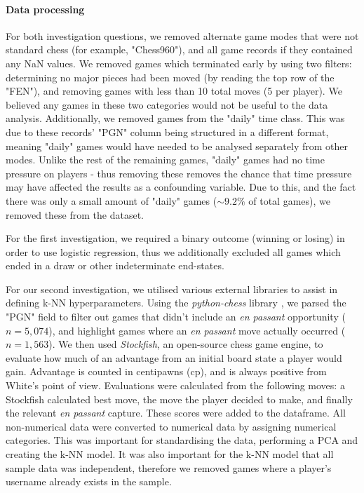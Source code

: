 \documentclass[10pt,a4paper]{article}
\begin{document}
\begin{multicols}{2}
\paragraph{Data processing}
For both investigation questions, we removed alternate game modes that were not standard chess (for example, "Chess960"), and all game records if they contained any NaN values. We removed games which terminated early by using two filters: determining no major pieces had been moved (by reading the top row of the "FEN"), and removing games with less than 10 total moves (5 per player). We believed any games in these two categories would not be useful to the data analysis. Additionally, we removed games from the "daily" time class. This was due to these records' "PGN" column being structured in a different format, meaning "daily" games would have needed to be analysed separately from other modes. Unlike the rest of the remaining games, "daily" games had no time pressure on players - thus removing these removes the chance that time pressure may have affected the results as a confounding variable. Due to this, and the fact there was only a small amount of "daily" games ($\sim9.2\%$ of total games), we removed these from the dataset.\newline

For the first investigation, we required a binary outcome (winning or losing) in order to use logistic regression, thus we additionally excluded all games which ended in a draw or other indeterminate end-states. \newline

For our second investigation, we utilised various external libraries to assist in defining k-NN hyperparameters. Using the \textit{python-chess} library \cite{python-chess}, we parsed the "PGN" field to filter out games that didn't include an \textit{en passant} opportunity ($n=5,074$), and highlight games where an \textit{en passant} move actually occurred ($n=1,563$). We then used \textit{Stockfish}\cite{StockFish}, an open-source chess game engine, to evaluate how much of an advantage from an initial board state a player would gain. Advantage is counted in centipawns (cp), and is always positive from White's point of view. Evaluations were calculated from the following moves: a Stockfish calculated best move, the move the player decided to make, and finally the relevant \textit{en passant} capture. These scores were added to the dataframe. All non-numerical data were converted to numerical data by assigning numerical categories. This was important for standardising the data, performing a PCA and creating the k-NN model. It was also important for the k-NN model that all sample data was independent, therefore we removed games where a player's username already exists in the sample.\newline



\end{multicols}
\end{document}
